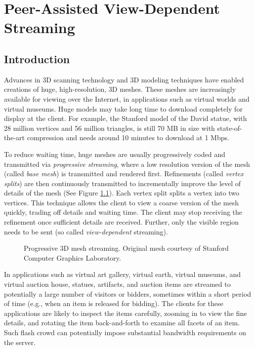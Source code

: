 \chapter{Peer-Assisted View-Dependent Streaming}
\section{Introduction}

    Advances in 3D scanning technology and 3D modeling
    techniques have enabled creations of huge,
    high-resolution, 3D meshes.  These meshes are
    increasingly available for viewing over the Internet, in
    applications such as virtual worlds and virtual museums.
    Huge models may take long time to download completely
    for display at the client.  For example, the Stanford
    model of the David statue, with 28 million vertices and
    56 million triangles, is still 70 MB in size with
    state-of-the-art compression
    \cite{alliez2001progressive} and needs around 10 minutes
    to download at 1 Mbps.

    To reduce waiting time, huge meshes are usually
    progressively coded \cite{hoppe96progressive} and
    transmitted via \textit{progressive streaming}, where a
    low resolution version of the mesh (called \textit{base
    mesh}) is transmitted and rendered first.  Refinements
    (called \textit{vertex splits}) are then continuously
    transmitted to incrementally improve the level of
    details of the mesh (See Figure \ref{progressive}).
    Each vertex split splits a vertex into two vertices.
    This technique allows the client to view a coarse
    version of the mesh quickly, trading off details and
    waiting time.  The client may stop receiving the
    refinement once sufficient details are received.
    Further, only the visible region needs to be sent (so called
    \textit{view-dependent} \cite{258843} streaming). 
    
    \begin{figure}[htbp!]
    \centering
    \caption{
    Progressive 3D mesh streaming. Original mesh 
    courtesy of Stanford Computer Graphics Laboratory.
    \label{progressive}}
    \end{figure}
    In applications such as virtual art gallery, virtual
    earth, virtual museums, and virtual auction house,
    statues, artifacts, and auction items are streamed to
    potentially a large number of visitors or bidders,
    sometimes within a short period of time (e.g., when an
    item is released for bidding).  The clients for these
    applications are likely to inspect the items carefully,
    zooming in to view the fine details, and rotating the
    item back-and-forth to examine all facets of an item.
    Such flash crowd can potentially impose substantial
    bandwidth requirements on the server.

